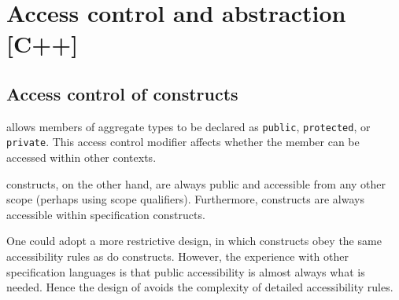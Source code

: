 \section{Access control and abstraction [C++]}
\label{sec:access}


\subsection{Access control of \NAME constructs}

\lang allows members of aggregate types to be declared as \lstinline|public|, \lstinline|protected|, or \lstinline|private|. This access control modifier affects whether the member can be accessed within other contexts. 

\NAME constructs, on the other hand, are always public and accessible from any other scope (perhaps using scope qualifiers). 
Furthermore, \lang constructs are always accessible within \NAME
specification constructs.

One could adopt a more restrictive design, in which \NAME constructs
obey the same accessibility rules as do \lang constructs. 
However, the experience with other specification languages is that 
public accessibility is almost always what is needed. Hence the design
of \NAME avoids the complexity of detailed accessibility rules.

%

